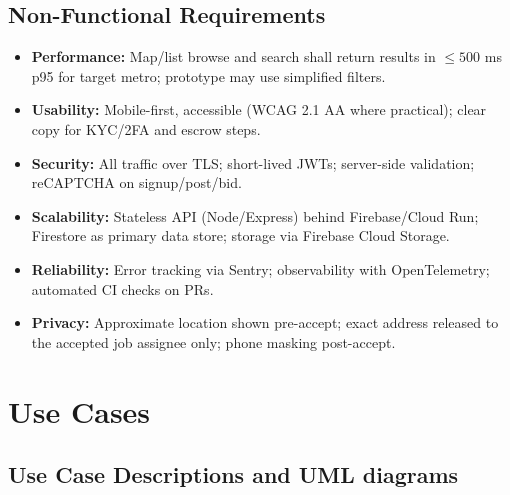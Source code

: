 \documentclass[11pt]{article}
\begin{document}
\subsection{Non-Functional Requirements}
\begin{itemize}[leftmargin=1.4em]
  \item \textbf{Performance:} Map/list browse and search shall return results in \(\leq 500\) ms p95 for target metro; prototype may use simplified filters.
  \item \textbf{Usability:} Mobile-first, accessible (WCAG 2.1 AA where practical); clear copy for KYC/2FA and escrow steps.
  \item \textbf{Security:} All traffic over TLS; short-lived JWTs; server-side validation; reCAPTCHA on signup/post/bid.
  \item \textbf{Scalability:} Stateless API (Node/Express) behind Firebase/Cloud Run; Firestore as primary data store; storage via Firebase Cloud Storage.
  \item \textbf{Reliability:} Error tracking via Sentry; observability with OpenTelemetry; automated CI checks on PRs.
  \item \textbf{Privacy:} Approximate location shown pre-accept; exact address released to the accepted job assignee only; phone masking post-accept.
\end{itemize}

\section{Use Cases}
\subsection{Use Case Descriptions and UML diagrams}
\end{document}
